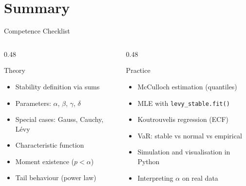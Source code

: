 \documentclass[9pt, aspectratio=169, t]{beamer}
\theoremstyle{definition}
\begin{document}
\section{Summary}

\begin{frame}{Competence Checklist}
\begin{columns}[T]
\begin{column}{0.48\textwidth}
\begin{block}{Theory}
\begin{itemize}
    \item[$\square$] Stability definition via sums
    \item[$\square$] Parameters: $\alpha$, $\beta$, $\gamma$, $\delta$
    \item[$\square$] Special cases: Gauss, Cauchy, L\'{e}vy
    \item[$\square$] Characteristic function
    \item[$\square$] Moment existence ($p < \alpha$)
    \item[$\square$] Tail behaviour (power law)
\end{itemize}
\end{block}
\end{column}
\begin{column}{0.48\textwidth}
\begin{block}{Practice}
\begin{itemize}
    \item[$\square$] McCulloch estimation (quantiles)
    \item[$\square$] MLE with \texttt{levy\_stable.fit()}
    \item[$\square$] Koutrouvelis regression (ECF)
    \item[$\square$] VaR: stable vs normal vs empirical
    \item[$\square$] Simulation and visualisation in Python
    \item[$\square$] Interpreting $\alpha$ on real data
\end{itemize}
\end{block}
\end{column}
\end{columns}
\end{frame}

\end{document}
